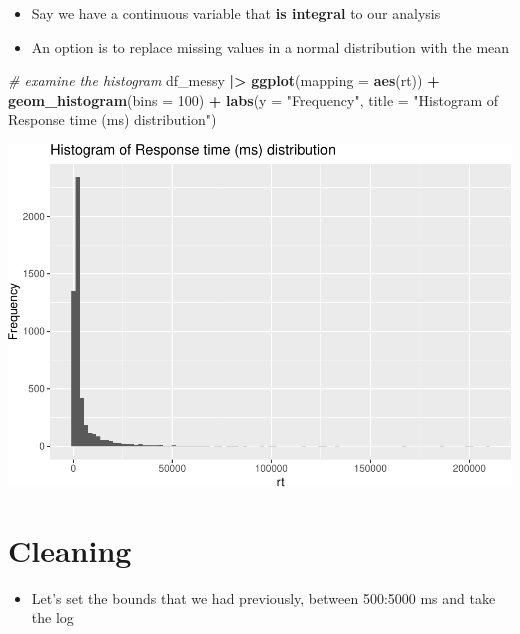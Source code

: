 \documentclass[
]{article}
\newenvironment{Shaded}{\begin{snugshade}}{\end{snugshade}}
\newcommand{\AttributeTok}[1]{\textcolor[rgb]{0.13,0.29,0.53}{#1}}
\newcommand{\CommentTok}[1]{\textcolor[rgb]{0.56,0.35,0.01}{\textit{#1}}}
\newcommand{\DecValTok}[1]{\textcolor[rgb]{0.00,0.00,0.81}{#1}}
\newcommand{\FunctionTok}[1]{\textcolor[rgb]{0.13,0.29,0.53}{\textbf{#1}}}
\newcommand{\NormalTok}[1]{#1}
\newcommand{\SpecialCharTok}[1]{\textcolor[rgb]{0.81,0.36,0.00}{\textbf{#1}}}
\newcommand{\StringTok}[1]{\textcolor[rgb]{0.31,0.60,0.02}{#1}}
\providecommand{\tightlist}{%
  \setlength{\itemsep}{0pt}\setlength{\parskip}{0pt}}
\begin{document}
\begin{itemize}
\tightlist
\item
  Say we have a continuous variable that \textbf{is integral} to our
  analysis
\item
  An option is to replace missing values in a normal distribution with
  the mean
\end{itemize}

\begin{Shaded}
\begin{Highlighting}[]
\CommentTok{\# examine the histogram}
\NormalTok{df\_messy }\SpecialCharTok{|\textgreater{}}
  \FunctionTok{ggplot}\NormalTok{(}\AttributeTok{mapping =} \FunctionTok{aes}\NormalTok{(rt)) }\SpecialCharTok{+}
  \FunctionTok{geom\_histogram}\NormalTok{(}\AttributeTok{bins =} \DecValTok{100}\NormalTok{) }\SpecialCharTok{+} 
  \FunctionTok{labs}\NormalTok{(}\AttributeTok{y =} \StringTok{"Frequency"}\NormalTok{,}
       \AttributeTok{title =} \StringTok{"Histogram of Response time (ms) distribution"}\NormalTok{)}
\end{Highlighting}
\end{Shaded}

\includegraphics{L5_Checking_Assumptions_pdf_files/figure-latex/unnamed-chunk-13-1.pdf}

\hypertarget{cleaning}{%
\section{Cleaning}\label{cleaning}}

\begin{itemize}
\tightlist
\item
  Let's set the bounds that we had previously, between 500:5000 ms and
  take the log
\end{itemize}
\end{document}
